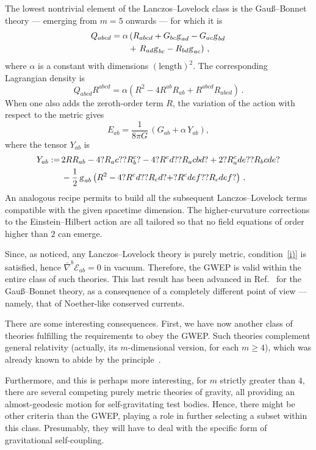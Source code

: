\documentclass[a4paper,showkeys,aps,prd,reprint,nofootinbib,showpacs,twocolumn]{revtex4-1}
\newcommand{\ton}[1]{\left(#1\right)}
\newcommand{\eq}[1]{\( #1 \)}
\newcommand{\eqd}[1]{\begin{equation} #1 \end{equation}}
\newcommand{\speq}[1]{\begin{equation}\begin{split}#1\end{split}\end{equation}}
\newcommand{\Cal}[1]{\mathcal{#1}}
\newcommand{\matg}{\text{\textsl{g}}}%
\theoremstyle{plain}
\begin{document}
The lowest nontrivial element of the Lanczos--Lovelock class is the Gau\ss{}--Bonnet theory --- emerging from \eq{m = 5} onwards --- for which it is
%
\speq{Q_{abcd} = \alpha &\left( R_{abcd} + G_{bc} \matg_{ad} - G_{ac} \matg_{bd} \right. \\
&+\left. R_{ad} \matg_{bc} - R_{bd} \matg_{ac} \right) \,,}
%
where \eq{\alpha} is a constant with dimensions \eq{\ton{\text{length}}^2}. The corresponding Lagrangian density is 
%
\eqd{Q_{abcd} R^{abcd} = \alpha \ton{R^2 - 4 R^{ab} R_{ab} + R^{abcd} R_{abcd}} \,. \label{eq:GBlagrangian}}
%
When one also adds the zeroth-order term \eq{R}, the variation of the action with respect to the metric gives 
%
\eqd{E_{ab}=\frac{1}{8\pi G}\,\left(G_{ab} + \alpha \, Y_{ab} \right), 
\label{eq:gbfieldeq}}
%
where the tensor \eq{Y_{ab}} is
%
\speq{Y_{ab} := \, &2 R R_{ab} - 4 ?R_ac? ?R^c_b? - 4 ?R^cd? ?R_acbd? + 2 ?R_a^cde? ?R_bcde?\\
&- \frac{1}{2}\, \matg_{ab} \left( R^2 - 4 ?R^cd? ?R_cd? + ?R^cdef? ?R_cdef? \right) \,. \label{eq:GB-field}}
%
An analogous recipe permits to build all the subsequent Lanczos--Lovelock terms compatible with the given spacetime dimension.  The higher-curvature corrections to the Einstein--Hilbert action are all tailored so that no field equations of order higher than \eq{2} can emerge.

Since, as noticed, any Lanczos--Lovelock theory is purely metric, condition~\eqref{i)} is satisfied, hence \eq{\bar{\nabla}^b \Cal{E}_{ab} = 0} in vacuum.  Therefore, the GWEP is valid within the entire class of such theories.  This last result has been advanced in Ref.~\cite{Deruelle:2003ps} for the Gau\ss{}--Bonnet theory, as a consequence of a completely different point of view --- namely, that of Noether-like conserved currents.

There are some interesting consequences. First, we have now another class of theories fulfilling the requirements to obey the GWEP.  Such theories complement general relativity (actually, its \eq{m}-dimensional version, for each \eq{m \ge 4}), which was already known to abide by the principle~\cite{deruelle, Deruelle:2003ps}.  

Furthermore, and this is perhaps more interesting, for \eq{m} strictly greater than \eq{4}, there are several competing purely metric theories of gravity, all providing an almost-geodesic motion for self-gravitating test bodies.  Hence, there might be other criteria than the GWEP, playing a role in further selecting a subset within this class.  Presumably, they will have to deal  with the specific form of gravitational self-coupling.
\end{document}

